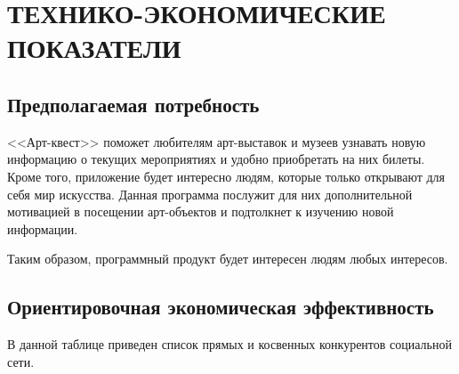 \pagestyle{fancy}

\normalsize


\section{ТЕХНИКО-ЭКОНОМИЧЕСКИЕ ПОКАЗАТЕЛИ}

\subsection{Предполагаемая потребность}	
	
\hspace{10mm} <<Арт-квест>> поможет любителям арт-выставок и музеев узнавать новую информацию о текущих мероприятиях и удобно приобретать на них билеты. Кроме того, приложение будет интересно людям, которые только открывают для себя мир искусства. Данная программа послужит для них дополнительной мотивацией в посещении арт-объектов и подтолкнет к изучению новой информации.

\hspace{10mm} Таким образом, программный продукт будет интересен людям любых интересов.
	
\subsection{Ориентировочная экономическая эффективность}
	
\hspace{10mm}В данной таблице приведен список прямых и косвенных конкурентов социальной сети.

